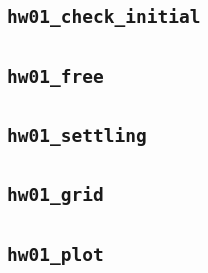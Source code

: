 \documentclass[11pt]{article}
\begin{document}
\subsection*{\texttt{hw01\_check\_initial}}

\clearpage
\subsection*{\texttt{hw01\_free}}

\clearpage
\subsection*{\texttt{hw01\_settling}}

\subsection*{\texttt{hw01\_grid}}

\clearpage
\subsection*{\texttt{hw01\_plot}}

\clearpage
\end{document}
